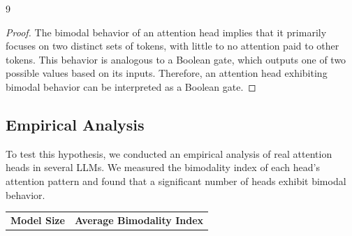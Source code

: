 \documentclass[11pt]{article}
\theoremstyle{definition}
\begin{document}
\begin{thebibliography}{9}
\begin{proof}






The bimodal behavior of an attention head implies that it primarily focuses on two distinct sets of tokens, with little to no attention paid to other tokens. This behavior is analogous to a Boolean gate, which outputs one of two possible values based on its inputs. Therefore, an attention head exhibiting bimodal behavior can be interpreted as a Boolean gate.






\end{proof}













\subsection{Empirical Analysis}






To test this hypothesis, we conducted an empirical analysis of real attention heads in several LLMs. We measured the bimodality index of each head's attention pattern and found that a significant number of heads exhibit bimodal behavior.













\begin{table}[h]






\centering






\begin{tabular}{|c|c|}






\hline






\textbf{Model Size} & \textbf{Average Bimodality Index} \\







\end{tabular}
\end{table}
\end{thebibliography}
\end{document}
